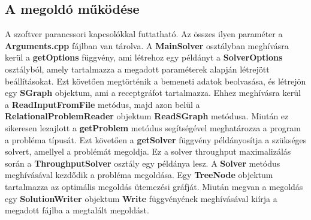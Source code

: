 \subsection{A megoldó működése}
A szoftver parancssori kapcsolókkal futtatható.
Az összes ilyen paraméter a \textbf{Arguments.cpp} fájlban van tárolva.
A \textbf{MainSolver} osztályban meghívásra kerül a \textbf{getOptions} függvény, ami létrehoz egy példányt a \textbf{SolverOptions} osztályból, amely tartalmazza a megadott paraméterek alapján létrejött beállításokat.
Ezt követően megtörténik a bemeneti adatok beolvasása, és létrejön egy \textbf{SGraph} objektum, ami a receptgráfot tartalmazza.
Ehhez meghívásra kerül a \textbf{ReadInputFromFile} metódus, majd azon belül a \textbf{RelationalProblemReader} objektum \textbf{ReadSGraph} metódusa.
Miután ez sikeresen lezajlott a \textbf{getProblem} metódus segítségével meghatározza a program a probléma típusát.
Ezt követően a \textbf{getSolver} függvény példányosítja a szükséges solvert, amellyel a problémát megoldja.
Ez a solver throughput maximalizálás során a \textbf{ThroughputSolver} osztály egy példánya lesz.
A \textbf{Solver} metódus meghívásával kezdődik a probléma megoldása.
Egy \textbf{TreeNode} objektum tartalmazza az optimális megoldás ütemezési gráfját.
Miután megvan a megoldás egy \textbf{SolutionWriter} objektum \textbf{Write} függvényének meghívásával kiírja a megadott fájlba a megtalált megoldást.

